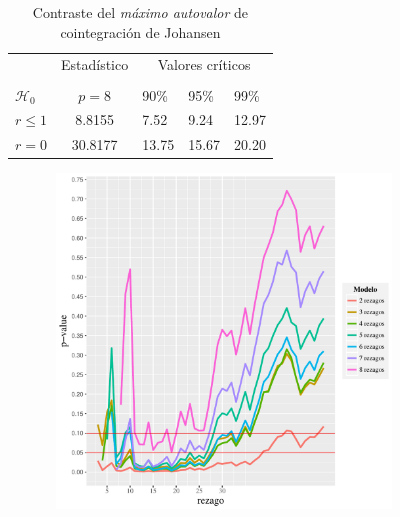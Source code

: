 \documentclass[12pt, twoside]{book}\usepackage[]{graphicx}\usepackage[]{color}
\makeatletter
\newenvironment{kframe}{%
 \def\at@end@of@kframe{}%
 \ifinner\ifhmode%
  \def\at@end@of@kframe{\end{minipage}}%
  \begin{minipage}{\columnwidth}%
 \fi\fi%
 \def\FrameCommand##1{\hskip\@totalleftmargin \hskip-\fboxsep
 \colorbox{shadecolor}{##1}\hskip-\fboxsep
     \hskip-\linewidth \hskip-\@totalleftmargin \hskip\columnwidth}%
 \MakeFramed {\advance\hsize-\width
   \@totalleftmargin\z@ \linewidth\hsize
   \@setminipage}}%
 {\par\unskip\endMakeFramed%
 \at@end@of@kframe}
\newenvironment{knitrout}{}{} %
\numberwithin{equation}{section}
\numberwithin{theorem}{section}
\numberwithin{teorema}{section}
\numberwithin{defi}{section}
\numberwithin{prop}{section}
\numberwithin{defi}{section}
\theoremstyle{plain}
\makeatother
\begin{document}
\begin{table}[h]
\caption{Contraste del \textit{máximo autovalor} de cointegración de Johansen}
\begin{center}
\begin{tabular}{@{}lrllll@{}}
\toprule
\multicolumn{1}{l}{} & \multicolumn{2}{c}{Estadístico} & \multicolumn{3}{c}{Valores críticos} \\
\cmidrule(l){2-3} \cmidrule(l){4-6} \\
\multicolumn{1}{l}{$\mathcal{H}_0$} & \multicolumn{2}{c}{$p = 8$} &
\multicolumn{1}{l}{90\%}&
\multicolumn{1}{l}{95\%}&
\multicolumn{1}{l}{99\%}
\\
\midrule
$r \leq 1$ & \multicolumn{2}{c}{ 8.8155} & 7.52 & 9.24 & 12.97 \\
$r = 0$ & \multicolumn{2}{c}{30.8177} & 13.75 & 15.67 & 20.20 \\
\bottomrule
\end{tabular}
\end{center}
\label{tab-11}
\end{table}





\begin{knitrout}
\color{fgcolor}\begin{kframe}


{\ttfamily\noindent\bfseries{}}\end{kframe}

{\centering \includegraphics[width=4.5in,height=3.5in]{figure/unnamed-chunk-21-1} 

}



\end{knitrout}
\end{document}
